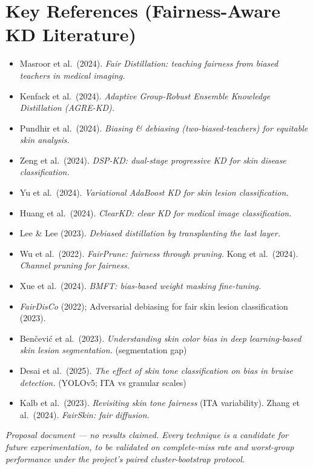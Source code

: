 \documentclass[11pt]{article}
\begin{document}
\section*{\textcolor{secblue}{Key References (Fairness-Aware KD Literature)}}
\small
\begin{itemize}[leftmargin=1.2em,itemsep=1pt]
\item Masroor et al.\ (2024). \emph{Fair Distillation: teaching fairness from biased teachers in medical imaging.}
\item Kenfack et al.\ (2024). \emph{Adaptive Group-Robust Ensemble Knowledge Distillation (AGRE-KD).}
\item Pundhir et al.\ (2024). \emph{Biasing \& debiasing (two-biased-teachers) for equitable skin analysis.}
\item Zeng et al.\ (2024). \emph{DSP-KD: dual-stage progressive KD for skin disease classification.}
\item Yu et al.\ (2024). \emph{Variational AdaBoost KD for skin lesion classification.}
\item Huang et al.\ (2024). \emph{ClearKD: clear KD for medical image classification.}
\item Lee \& Lee (2023). \emph{Debiased distillation by transplanting the last layer.}
\item Wu et al.\ (2022). \emph{FairPrune: fairness through pruning.} \quad Kong et al.\ (2024). \emph{Channel pruning for fairness.}
\item Xue et al.\ (2024). \emph{BMFT: bias-based weight masking fine-tuning.}
\item \emph{FairDisCo} (2022); Adversarial debiasing for fair skin lesion classification (2023).
\item Ben\v{c}evi\'c et al.\ (2023). \emph{Understanding skin color bias in deep learning-based skin lesion segmentation.} (segmentation gap)
\item Desai et al.\ (2025). \emph{The effect of skin tone classification on bias in bruise detection.} (YOLOv5; ITA vs granular scales)
\item Kalb et al.\ (2023). \emph{Revisiting skin tone fairness} (ITA variability). \quad Zhang et al.\ (2024). \emph{FairSkin: fair diffusion.}
\end{itemize}

\vfill
\begin{center}\footnotesize\itshape
Proposal document --- no results claimed. Every technique is a candidate for future experimentation,
to be validated on complete-miss rate and worst-group performance under the project's paired
cluster-bootstrap protocol.
\end{center}
\end{document}
